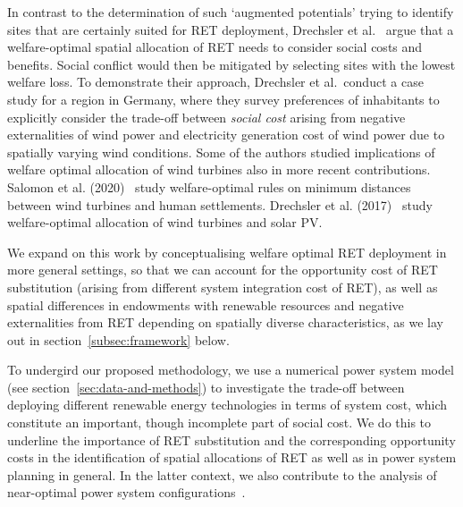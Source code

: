 \documentclass[review, 3p, times]{elsarticle} %
\begin{document}
    In contrast to the determination of such `augmented potentials' trying to identify sites that are certainly suited
    for RET deployment, Drechsler et al.\ \cite{Drechsler2011} argue that a welfare-optimal spatial allocation of RET
    needs to consider social costs and benefits.
    Social conflict would then be mitigated by selecting sites with the lowest welfare loss.
    To demonstrate their approach, Drechsler et al.\ conduct a case study for a region in Germany, where they survey
    preferences of inhabitants to explicitly consider the trade-off between \emph{social cost} arising from negative
    externalities of wind power and electricity generation cost of wind power due to spatially varying wind conditions.
    Some of the authors studied implications of welfare optimal allocation of wind turbines also in more recent
    contributions.
    Salomon et al. (2020)~\citep{Salomon2020} study welfare-optimal rules on minimum distances between wind turbines and
    human settlements.
    Drechsler et al. (2017)~\citep{Drechsler2017} study welfare-optimal allocation of wind turbines and solar PV.

    We expand on this work by conceptualising welfare optimal RET deployment in more general settings, so that we can
    account for the opportunity cost of RET substitution (arising from different system integration cost of RET), as
    well as spatial differences in endowments with renewable resources and negative externalities from RET depending on
    spatially diverse characteristics, as we lay out in section~\ref{subsec:framework} below.

    To undergird our proposed methodology, we use a numerical power system model (see
    section~\ref{sec:data-and-methods}) to investigate the trade-off between deploying different renewable energy
    technologies in terms of system cost, which constitute an important, though incomplete part of social cost.
    We do this to underline the importance of RET substitution and the corresponding opportunity costs in the
    identification of spatial allocations of RET as well as in power system planning in general.
    In the latter context, we also contribute to the analysis of near-optimal power system
    configurations~\citep[see e.g.][]{Neumann2019,Schlachtberger2017}.
\end{document}
